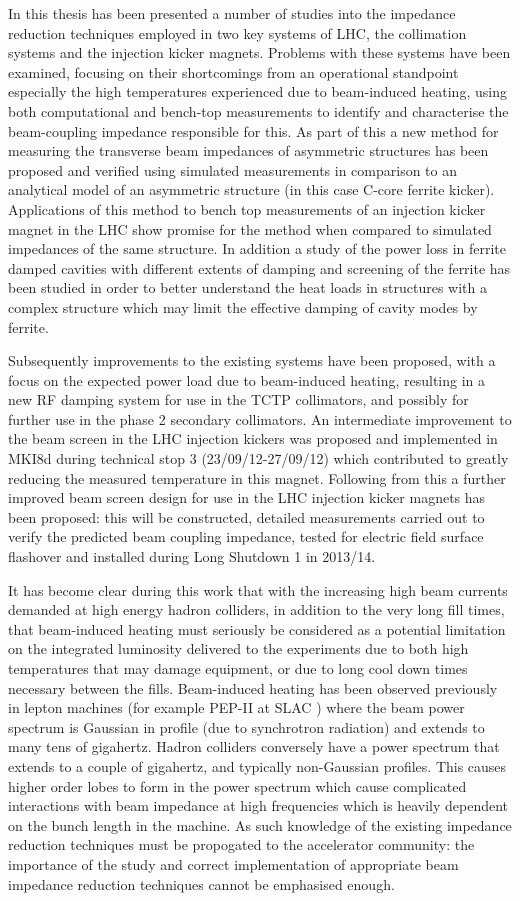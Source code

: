In this thesis has been presented a number of studies into the impedance reduction techniques employed in two key systems of LHC, the collimation systems and the injection kicker magnets. Problems with these systems have been examined, focusing on their shortcomings from an operational standpoint especially the high temperatures experienced due to beam-induced heating, using both computational and bench-top measurements to identify and characterise the beam-coupling impedance responsible for this. As part of this a new method for measuring the transverse beam impedances of asymmetric structures has been proposed and verified using simulated measurements in comparison to an analytical model of an asymmetric structure (in this case C-core ferrite kicker). Applications of this method to bench top measurements of an injection kicker magnet in the LHC show promise for the method when compared to simulated impedances of the same structure. In addition a study of the power loss in ferrite damped cavities with different extents of damping and screening of the ferrite has been studied in order to better understand the heat loads in structures with a complex structure which may limit the effective damping of cavity modes by ferrite.

Subsequently improvements to the existing systems have been proposed, with a focus on the expected power load due to beam-induced heating, resulting in a new RF damping system for use in the TCTP collimators, and possibly for further use in the phase 2 secondary collimators. An intermediate improvement to the beam screen in the LHC injection kickers was proposed and implemented in MKI8d during technical stop 3 (23/09/12-27/09/12) which contributed to greatly reducing the measured temperature in this magnet. Following from this a further improved beam screen design for use in the LHC injection kicker magnets has been proposed: this will be constructed, detailed measurements carried out to verify the predicted beam coupling impedance, tested for electric field surface flashover and installed during Long Shutdown 1 in 2013/14.

It has become clear during this work that with the increasing high beam currents demanded at high energy hadron colliders, in addition to the very long fill times, that beam-induced heating must seriously be considered as a potential limitation on the integrated luminosity delivered to the experiments due to both high temperatures that may damage equipment, or due to long cool down times necessary between the fills. Beam-induced heating has been observed previously in lepton machines (for example PEP-II at SLAC \cite{Pivi:PEP}) where the beam power spectrum is Gaussian in profile (due to synchrotron radiation) and extends to many tens of gigahertz. Hadron colliders conversely have a power spectrum that extends to a couple of gigahertz, and typically non-Gaussian profiles. This causes higher order lobes to form in the power spectrum which cause complicated interactions with beam impedance at high frequencies which is heavily dependent on the bunch length in the machine. As such knowledge of the existing impedance reduction techniques must be propogated to the accelerator community: the importance of the study and correct implementation of appropriate beam impedance reduction techniques cannot be emphasised enough.